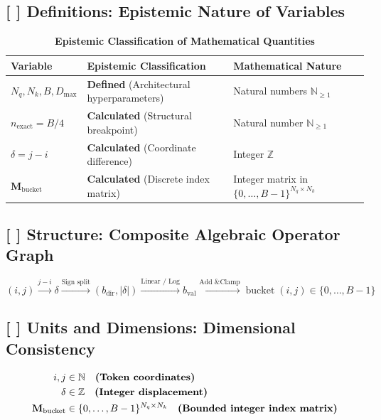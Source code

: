 \documentclass[11pt,a4paper]{article}
\theoremstyle{definition}
\begin{document}
\subsection{[ ] Definitions: Epistemic Nature of Variables}
\begin{table}[h]
\centering
\caption{\textbf{Epistemic Classification of Mathematical Quantities}}
\begin{tabular}{lll}
\toprule
\textbf{Variable} & \textbf{Epistemic Classification} & \textbf{Mathematical Nature} \\
\midrule
$N_q, N_k, B, D_{\text{max}}$ & \textbf{Defined} (Architectural hyperparameters) & Natural numbers $\mathbb{N}_{\ge 1}$ \\
$n_{\text{exact}} = B/4$ & \textbf{Calculated} (Structural breakpoint) & Natural number $\mathbb{N}_{\ge 1}$ \\
$\delta = j - i$ & \textbf{Calculated} (Coordinate difference) & Integer $\mathbb{Z}$ \\
$\mathbf{M}_{\text{bucket}}$ & \textbf{Calculated} (Discrete index matrix) & Integer matrix in $\{0, \dots, B-1\}^{N_q \times N_k}$ \\
\bottomrule
\end{tabular}
\end{table}

\subsection{[ ] Structure: Composite Algebraic Operator Graph}
{\boldmath
\begin{equation}
(i, j) \xrightarrow{j - i} \delta \xrightarrow{\text{Sign split}} (b_{\text{dir}}, |\delta|) \xrightarrow{\text{Linear / Log}} b_{\text{val}} \xrightarrow{\text{Add \& Clamp}} \operatorname{bucket}(i, j) \in \{0, \dots, B-1\}
\end{equation}
}

\subsection{[ ] Units and Dimensions: Dimensional Consistency}
{\boldmath
\begin{align}
i, j &\in \mathbb{N} \quad \text{\textbf{(Token coordinates)}} \\
\delta &\in \mathbb{Z} \quad \text{\textbf{(Integer displacement)}} \\
\mathbf{M}_{\text{bucket}} &\in \{0, \dots, B-1\}^{N_q \times N_k} \quad \text{\textbf{(Bounded integer index matrix)}}
\end{align}
}
\end{document}
